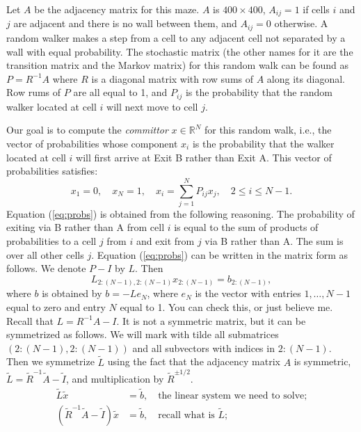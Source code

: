\documentclass{../../../kin_math}
\begin{document}
\begin{questions}
  Let $A$ be the adjacency matrix for this maze. $A$ is $400 \times 400$, $A_{ij} = 1$ if cells $i$ and $j$ are adjacent and there is no wall between them, and $A_{ij} = 0$ otherwise. A random walker makes a step from a cell to any adjacent cell not separated by a wall with equal probability. The stochastic matrix (the other names for it are the transition matrix and the Markov matrix) for this random walk can be found as $P = R^{-1} A$ where $R$ is a diagonal matrix with row sums of $A$ along its diagonal. Row rums of $P$ are all equal to 1, and $P_{ij}$ is the probability that the random walker located at cell $i$ will next move to cell $j$.

  Our goal is to compute the \emph{committor} $x \in \mathbb{R}^N$ for this random walk, i.e., the vector of probabilities whose component $x_i$ is the probability that the walker located at cell $i$ will first arrive at Exit B rather than Exit A. This vector of probabilities satisfies:
  \begin{equation}
    \label{eq:probs}
    x_1 = 0, \quad x_N = 1, \quad x_i = \sum_{j = 1}^N P_{ij} x_j, \quad 2 \leq i \leq N - 1.
  \end{equation}
  Equation (\ref{eq:probs}) is obtained from the following reasoning. The probability of exiting via B rather than A from cell $i$ is equal to the sum of products of probabilities to a cell $j$ from $i$ and exit from $j$ via B rather than A. The sum is over all other cells $j$. Equation (\ref{eq:probs}) can be written in the matrix form as follows. We denote $P - I$ by $L$. Then
  \begin{equation}
    L_{2:(N - 1), 2:(N - 1)} x_{2:(N - 1)} = b_{2:(N - 1)},
  \end{equation}
  where $b$ is obtained by $b = -Le_N$, where $e_N$ is the vector with entries $1, \dots, N - 1$ equal to zero and entry $N$ equal to 1. You can check this, or just believe me. Recall that $L = R^{-1} A - I$. It is not a symmetric matrix, but it can be symmetrized as follows. We will mark with tilde all submatrices $(2 : (N - 1), 2 : (N - 1))$ and all subvectors with indices in $2 : (N - 1)$. Then we symmetrize $\tilde{L}$ using the fact that the adjacency matrix $A$ is symmetric, $\tilde{L} = \tilde{R}^{-1} \tilde{A} - \tilde{I}$, and multiplication by $\tilde{R}^{\pm 1 / 2}$.
  \begin{align}
    \tilde{L} \tilde{x} &= \tilde{b}, \quad \text{the linear system we need to solve;} \\
    (\tilde{R}^{-1} \tilde{A} - \tilde{I}) \tilde{x} &= \tilde{b}, \quad \text{recall what is $\tilde{L}$;} \\

\end{align}
\end{questions}
\end{document}
